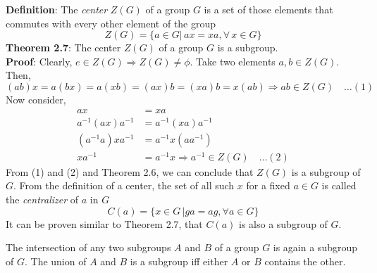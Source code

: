 \documentclass[a4paper, 12pt]{article}
\numberwithin{equation}{section}
\begin{document}
\noindent
\textbf{Definition}: The \textit{center} $Z(G)$ of a group $G$ is a set of those elements that commutes with every other element of the group
\begin{equation}
Z(G) = \{ a \in G | \,ax = xa, \forall \,x \in G \}
\end{equation}
\newpage
\noindent
\textbf{Theorem 2.7}: The center $Z(G)$ of a group $G$ is a subgroup.\\
\textbf{Proof}: Clearly, $e \in Z(G) \Rightarrow Z(G) \neq \phi$. Take two elements $a, b \in Z(G)$. Then, 
$$(ab)x = a(bx) = a(xb) = (ax)b = (xa)b = x(ab) \Rightarrow ab \in Z(G) \quad \ldots (1)$$
Now consider,\\[-2.5em]
\begin{align*}
ax &= xa\\
a^{-1}(ax)a^{-1} &= a^{-1}(xa)a^{-1}\\
(a^{-1} a)xa^{-1} &= a^{-1}x (aa^{-1})\\
xa^{-1} &= a^{-1}x \Rightarrow a^{-1} \in Z(G) \quad \ldots (2)
\end{align*}
From (1) and (2) and Theorem 2.6, we can conclude that $Z(G)$ is a subgroup of $G$. From the definition of a center, the set of all such $x$ for a fixed $a \in G$ is called the \textit{centralizer} of $a$ in $G$
\begin{equation}
C(a) = \{ x \in G \,| ga = ag, \forall a \in G \}
\end{equation}
It can be proven similar to Theorem 2.7, that $C(a)$ is also a subgroup of $G$.

The intersection of any two subgroups $A$ and $B$ of a group $G$ is again a subgroup of $G$. The union of $A$ and $B$ is a subgroup iff either $A$ or $B$ contains the other.
\end{document}

